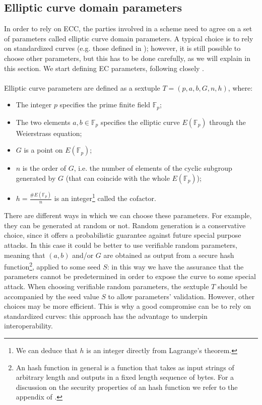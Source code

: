 \subsection{Elliptic curve domain parameters}
In order to rely on ECC, the parties involved in a scheme need to agree on a set of parameters called elliptic curve domain parameters. A typical choice is to rely on standardized curves (e.g. those defined in \cite{RefWork:3}); however, it is still possible to choose other parameters, but this has to be done carefully, as we will explain in this section. We start defining EC parameters, following closely \cite{RefWork:2}.
\\
\\
Elliptic curve parameters are defined as a sextuple $T = (p, a, b, G, n, h)$, where:
\begin{itemize}
	\item The integer $p$ specifies the prime finite field $\mathbb{F}_p$;
	\item The two elements $a, b \in \mathbb{F}_p$ specifies the elliptic curve $E(\mathbb{F}_p)$ through the Weierstrass equation;
	\item $G$ is a point on $E(\mathbb{F}_p)$;
	\item $n$ is the order of $G$, i.e. the number of elements of the cyclic subgroup generated by $G$ (that can coincide with the whole $E(\mathbb{F}_p)$);
	\item $h = \frac{\#E(\mathbb{F}_p)}{n}$ is an integer\footnote{We can deduce that $h$ is an integer directly from Lagrange's theorem.} called the cofactor. 
\end{itemize}
There are different ways in which we can choose these parameters. For example, they can be generated at random or not. Random generation is a conservative choice, since it offers a probabilistic guarantee against future special purpose attacks. In this case it could be better to use verifiable random parameters, meaning that $(a, b)$ and/or $G$ are obtained as output from a secure hash function\footnote{An hash function in general is a function that takes as input strings of arbitrary length and outputs in a fixed length sequence of bytes. For a discussion on the security properties of an hash function we refer to the appendix of \cite{RefWork:2}.}, applied to some seed $S$: in this way we have the assurance that the parameters cannot be predetermined in order to expose the curve to some special attack. When choosing verifiable random parameters, the sextuple $T$ should be accompanied by the seed value $S$ to allow parameters' validation. However, other choices may be more efficient. This is why a good compromise can be to rely on standardized curves: this approach has the advantage to underpin interoperability.
